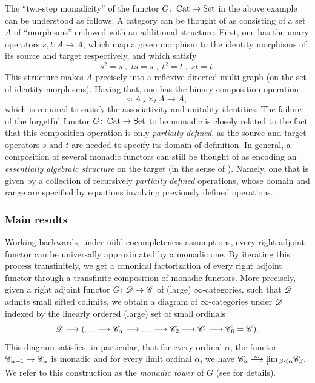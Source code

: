 \documentclass[12pt]{article}
\begin{document}
The ``two-step monadicity'' of the functor $G\colon \operatorname{Cat} \to \mathrm{Set}$ in the above example can be understood as follows. A category can be thought of as consisting of a set $A$ of ``morphisms'' endowed with an additional structure. First, one has the unary operators $s,t\colon A \to A$, which map a given morphism to the identity morphisms of its source and target respectively, and which satisfy
\[
    s^2=s\;,\;ts=s\;,\;t^2=t\;,\;st=t.
\]
This structure makes $A$ precisely into a reflexive directed multi-graph (on the set of identity morphisms). Having that, one has the binary composition operation
\[
    \circ \colon 
    A\; {}_s\!\!\times_t A \longrightarrow A,
\]
which is required to satisfy the associativity and unitality identities.
The failure of the forgetful functor 
$G\colon \operatorname{Cat} \to \mathrm{Set}$
to be monadic is closely related to the fact that this composition operation is only \textit{partially defined}, as the source and target operators $s$ and $t$ are  needed to specify its domain of definition. In general, a composition of several monadic functors can still be thought of as encoding an \textit{essentially algebraic structure} on the target (in the sense of \cite{freyd1972aspects}). Namely, one that is given by a collection of recursively \textit{partially defined} operations, whose domain and range are specified by equations involving previously defined operations. 


\subsubsection{Main results}

Working backwards, under mild cocompleteness assumptions, every right adjoint functor can be universally approximated by a monadic one. By iterating this process transfinitely, we get a canonical factorization of every right adjoint functor through a transfinite composition of monadic functors. More precisely, 
given a right adjoint functor $G\colon\mathscr{D} \to \mathscr{C}$  of (large) $\infty$-categories, such that $\mathscr{D}$ admits small sifted colimits, we obtain a diagram of $\infty$-categories under $\mathscr{D}$ indexed by the linearly ordered (large) set of small ordinals
\[
    \cD \lto 
    (\dots \lto \cC_\alpha \lto \dots \lto \cC_2 \lto \cC_1 \lto \cC_0 = \cC).
\]
This diagram satisfies, in particular, that for every ordinal $\alpha$, the functor 
$\mathscr{C}_{\alpha+1} \to \mathscr{C}_\alpha$ is monadic and for every limit ordinal $\alpha$, we have 
$\cC_\alpha \iso  \invlim_{\beta<\alpha}\cC_\beta.$
We refer to this construction as the \textit{monadic tower} of $G$ (see  for details). 
\end{document}
